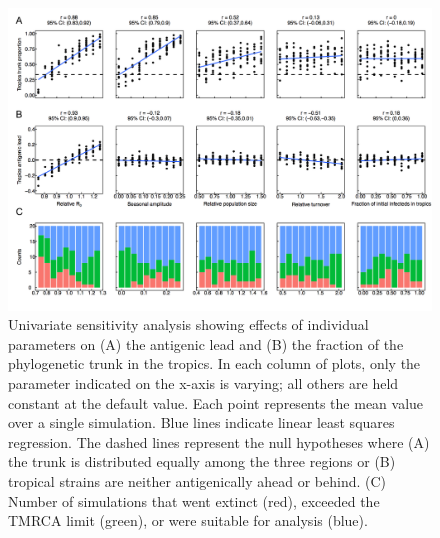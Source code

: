 \documentclass[10pt]{article}
\begin{document}
\begin{figure}[h!]
\centerline{\includegraphics[width=7in]{./manuscript/figures/univariate_summary/univariate_summary.pdf}}
\caption{Univariate sensitivity analysis showing effects of individual parameters on (A) the antigenic lead and (B) the fraction of the phylogenetic trunk in the tropics. 
In each column of plots, only the parameter indicated on the x-axis is varying; all others are held constant at the default value. 
Each point represents the mean value over a single simulation. 
Blue lines indicate linear least squares regression. 
The dashed lines represent the null hypotheses where (A) the trunk is distributed equally among the three regions or (B) tropical strains are neither antigenically ahead or behind. 
(C) Number of simulations that went extinct (red), exceeded the TMRCA limit (green), or were suitable for analysis (blue).}
\label{fig:univariate_summary}
\end{figure}
\end{document}
